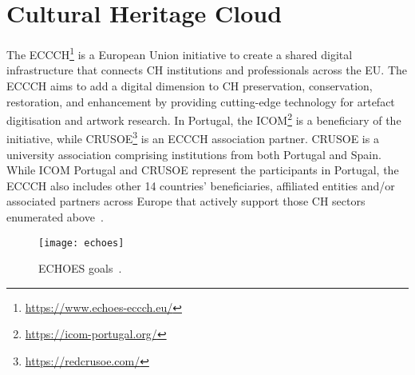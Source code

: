 \section{Cultural Heritage Cloud}
\label{sec:ch_cloud}

The \gls{ECCCH}\footnote{\url{https://www.echoes-eccch.eu/}} is a European Union initiative 
to create a shared digital infrastructure that connects \gls{CH} institutions and professionals across the \gls{EU}.
The \gls{ECCCH} aims to add a digital dimension to \gls{CH} preservation, conservation, restoration, and enhancement 
by providing cutting-edge technology for artefact digitisation and artwork research. 
In Portugal, the \gls{ICOM}\footnote{\url{https://icom-portugal.org/}} is a beneficiary of the initiative, while \gls{CRUSOE}\footnote{\url{https://redcrusoe.com/}} is an \gls{ECCCH} association partner. \gls{CRUSOE} is a university association comprising institutions from both Portugal and Spain.
While \gls{ICOM} Portugal and \gls{CRUSOE} represent the participants in Portugal, the \gls{ECCCH} also includes other 14 countries' beneficiaries, affiliated entities and/or associated partners across Europe that actively support those \gls{CH} sectors enumerated above~\cite{ecchoes}.


\begin{figure}[h!]
    \centering
    \texttt{[image: echoes]}
    \caption{\gls{ECHOES} goals~\cite{ecchoes}.} 
    \label{fig:echoes}
\end{figure}
\FloatBarrier

